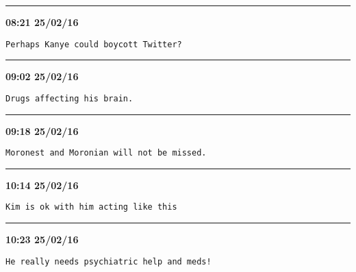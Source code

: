 \hrule%

\begin{adjustwidth}{0cm}{0cm}
\footnotesize \textbf{08:21 25/02/16}

\begin{lstlisting}[breaklines, breakatwhitespace, basicstyle=\small, frame=leftline]
Perhaps Kanye could boycott Twitter?
\end{lstlisting}
\end{adjustwidth}

\hrule%

\begin{adjustwidth}{0cm}{0cm}
\footnotesize \textbf{09:02 25/02/16}

\begin{lstlisting}[breaklines, breakatwhitespace, basicstyle=\small, frame=leftline]
Drugs affecting his brain.
\end{lstlisting}
\end{adjustwidth}

\hrule%

\begin{adjustwidth}{0cm}{0cm}
\footnotesize \textbf{09:18 25/02/16}

\begin{lstlisting}[breaklines, breakatwhitespace, basicstyle=\small, frame=leftline]
Moronest and Moronian will not be missed.
\end{lstlisting}
\end{adjustwidth}

\hrule%

\begin{adjustwidth}{0cm}{0cm}
\footnotesize \textbf{10:14 25/02/16}

\begin{lstlisting}[breaklines, breakatwhitespace, basicstyle=\small, frame=leftline]
Kim is ok with him acting like this
\end{lstlisting}
\end{adjustwidth}

\hrule%

\begin{adjustwidth}{0cm}{0cm}
\footnotesize \textbf{10:23 25/02/16}

\begin{lstlisting}[breaklines, breakatwhitespace, basicstyle=\small, frame=leftline]
He really needs psychiatric help and meds!
\end{lstlisting}
\end{adjustwidth}

